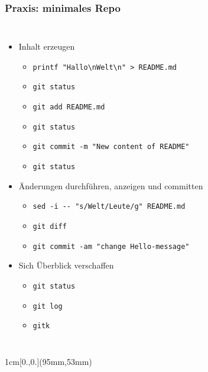 \documentclass{beamer}
\begin{document}
\begin{frame}[fragile,label=gitintro40]
\frametitle{Praxis: minimales Repo}
\vspace{-5mm}
\begin{columns}
\begin{itemize}
 \item Inhalt erzeugen
\begin{itemize}
 \item \verb|printf "Hallo\nWelt\n" > README.md|
 \item \texttt{git status}
 \item \texttt{git add README.md} \qquad {}
 \item \texttt{git status}
 \item \verb|git commit -m "New content of README"| %
 \item \texttt{git status}
\end{itemize}
\pause
 \item Änderungen durchführen, anzeigen und committen
\begin{itemize}
 \item \verb|sed -i -- "s/Welt/Leute/g" README.md|
 \item \texttt{git diff}
 \pause
 \pause
 \item \verb|git commit -am "change Hello-message"|
\end{itemize}
 \pause
 \item Sich Überblick verschaffen
 \begin{itemize}
 \item \texttt{git status}
 \item \texttt{git log}
 \item \texttt{gitk}
 \end{itemize}
\end{itemize}

~
\end{columns}


\begin{textblock*}{1cm}[0.,0.](95mm,53mm)
\end{textblock*}

\end{frame}
\end{document}
